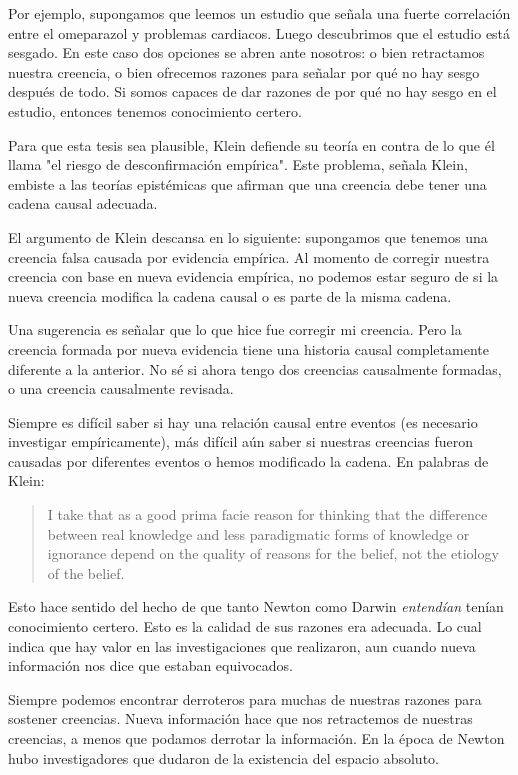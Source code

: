 Por ejemplo, supongamos que leemos un estudio que señala una fuerte correlación entre el omeparazol y problemas cardiacos.
Luego descubrimos que el estudio está sesgado.
En este caso dos opciones se abren ante nosotros: o bien retractamos nuestra creencia, o bien ofrecemos razones para señalar por qué no hay sesgo después de todo.
Si somos capaces de dar razones de por qué no hay sesgo en el estudio, entonces tenemos conocimiento certero.

Para que esta tesis sea plausible, Klein defiende su teoría en contra de lo que él llama "el riesgo de desconfirmación empírica".
Este problema, señala Klein, embiste a las teorías epistémicas que afirman que una creencia debe tener una cadena causal adecuada.

El argumento de Klein descansa en lo siguiente: supongamos que tenemos una creencia falsa causada por evidencia empírica.
Al momento de corregir nuestra creencia con base en nueva evidencia empírica, no podemos estar seguro de si la nueva creencia modifica la cadena causal o es parte de la misma cadena.

Una sugerencia es señalar que lo que hice fue corregir mi creencia.
Pero la creencia formada por nueva evidencia tiene una historia causal completamente diferente a la anterior.
No sé si ahora tengo dos creencias causalmente formadas, o una creencia causalmente revisada. 

Siempre es difícil saber si hay una relación causal entre eventos (es necesario investigar empíricamente), más difícil aún saber si nuestras creencias fueron causadas por diferentes eventos o hemos modificado la cadena. 
En palabras de Klein:

\begin{quote}
    I take that as a good prima facie reason for thinking that the difference between real knowledge and less paradigmatic forms of knowledge or ignorance depend on the quality of reasons for the belief, not the etiology of the belief. \parencite[][p. 403]{klein2019}
\end{quote}

Esto hace sentido del hecho de que tanto Newton como Darwin \emph{entendían} tenían conocimiento certero. 
Esto es la calidad de sus razones era adecuada. 
Lo cual indica que hay valor en las investigaciones que realizaron, aun cuando nueva información nos dice que estaban equivocados. 

Siempre podemos encontrar derroteros para muchas de nuestras razones para sostener creencias.
Nueva información hace que nos retractemos de nuestras creencias, a menos que podamos derrotar la información.
En la época de Newton hubo investigadores que dudaron de la existencia del espacio absoluto.

